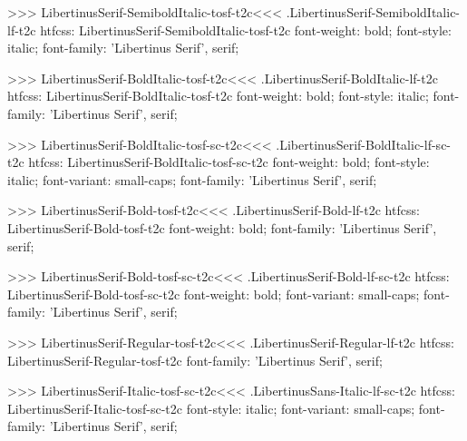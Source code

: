 {{{{{{{{{{{{{{{{>>>
\<LibertinusSerif-SemiboldItalic-tosf-t2c\><<<
.LibertinusSerif-SemiboldItalic-lf-t2c
htfcss:  LibertinusSerif-SemiboldItalic-tosf-t2c  font-weight: bold; font-style: italic; font-family: 'Libertinus Serif', serif;

>>>
\<LibertinusSerif-BoldItalic-tosf-t2c\><<<
.LibertinusSerif-BoldItalic-lf-t2c
htfcss:  LibertinusSerif-BoldItalic-tosf-t2c  font-weight: bold; font-style: italic; font-family: 'Libertinus Serif', serif;

>>>
\<LibertinusSerif-BoldItalic-tosf-sc-t2c\><<<
.LibertinusSerif-BoldItalic-lf-sc-t2c
htfcss:  LibertinusSerif-BoldItalic-tosf-sc-t2c  font-weight: bold; font-style: italic; font-variant: small-caps; font-family: 'Libertinus Serif', serif;

>>>
\<LibertinusSerif-Bold-tosf-t2c\><<<
.LibertinusSerif-Bold-lf-t2c
htfcss:  LibertinusSerif-Bold-tosf-t2c  font-weight: bold; font-family: 'Libertinus Serif', serif;

>>>
\<LibertinusSerif-Bold-tosf-sc-t2c\><<<
.LibertinusSerif-Bold-lf-sc-t2c
htfcss:  LibertinusSerif-Bold-tosf-sc-t2c  font-weight: bold; font-variant: small-caps; font-family: 'Libertinus Serif', serif;

>>>
\<LibertinusSerif-Regular-tosf-t2c\><<<
.LibertinusSerif-Regular-lf-t2c
htfcss:  LibertinusSerif-Regular-tosf-t2c  font-family: 'Libertinus Serif', serif;

>>>
\<LibertinusSerif-Italic-tosf-sc-t2c\><<<
.LibertinusSans-Italic-lf-sc-t2c
htfcss:  LibertinusSerif-Italic-tosf-sc-t2c  font-style: italic; font-variant: small-caps; font-family: 'Libertinus Serif', serif;

}}}}}}}}}}}}}}}}
